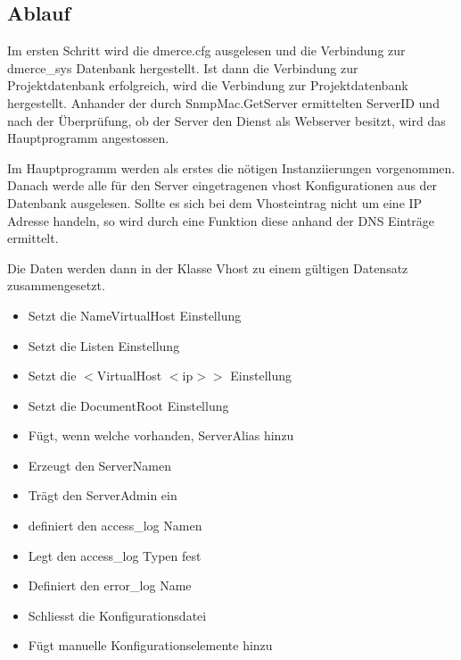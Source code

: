 \wanciprgmethodend

\subsection{Ablauf}

Im ersten Schritt wird die dmerce.cfg ausgelesen und die Verbindung
zur dmerce\_sys Datenbank hergestellt. Ist dann die Verbindung zur
Projektdatenbank erfolgreich, wird die Verbindung zur Projektdatenbank
hergestellt. Anhander der durch SnmpMac.GetServer ermittelten ServerID
und nach der \"Uberpr\"ufung, ob der Server den Dienst als Webserver
besitzt, wird das Hauptprogramm angestossen.

Im Hauptprogramm werden als erstes die n\"otigen Instanziierungen
vorgenommen.  Danach werde alle f\"ur den Server eingetragenen vhost
Konfigurationen aus der Datenbank ausgelesen. Sollte es sich bei dem
Vhosteintrag nicht um eine IP Adresse handeln, so wird durch eine
Funktion diese anhand der DNS Eintr\"age ermittelt.

Die Daten werden dann in der Klasse Vhost zu einem g\"ultigen
Datensatz zusammengesetzt.

\begin{itemize}
\item {} Setzt die NameVirtualHost
  Einstellung
\item {} Setzt die Listen Einstellung
\item {} Setzt die $<$VirtualHost
  $<$ip$>$$>$ Einstellung
\item {}
  Setzt die DocumentRoot Einstellung
\item {} F\"ugt, wenn welche
  vorhanden, ServerAlias hinzu
\item {} Erzeugt den ServerNamen
\item
  Tr\"agt den ServerAdmin ein
\item {} definiert den
  access\_log Namen
\item {}
  Legt den access\_log Typen fest
\item {} Definiert den
  error\_log Name
\item {} Schliesst die Konfigurationsdatei
\item
  F\"ugt manuelle Konfigurationselemente hinzu
\end{itemize}

